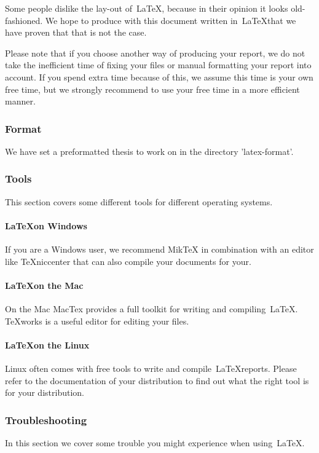 \documentclass{latex-format/stylesheets/BEMNextstyle}
\begin{document}
Some people dislike the lay-out of~\LaTeX, because in their opinion it looks old-fashioned. We hope to produce with this document written in~\LaTeX that we have proven that that is not the case.

Please note that if you choose another way of producing your report, we do not take the inefficient time of fixing your files or manual formatting your report into account. If you spend extra time because of this, we assume this time is your own free time, but we strongly recommend to use your free time in a more efficient manner.

\subsubsection*{Format}
We have set a preformatted thesis to work on in the directory 'latex-format'.

\subsubsection*{Tools}
This section covers some different tools for different operating systems.

\paragraph*{\LaTeX on Windows}
If you are a Windows user, we recommend MikTeX in combination with an editor like TeXniccenter that can also compile your documents for your.

\paragraph*{\LaTeX on the Mac}
On the Mac MacTex provides a full toolkit for writing and compiling~\LaTeX. TeXworks is a useful editor for editing your files.

\paragraph*{\LaTeX on the Linux}
Linux often comes with free tools to write and compile~\LaTeX reports. Please refer to the documentation of your distribution to find out what the right tool is for your distribution.

\subsubsection*{Troubleshooting}
In this section we cover some trouble you might experience when using~\LaTeX.
\end{document}
